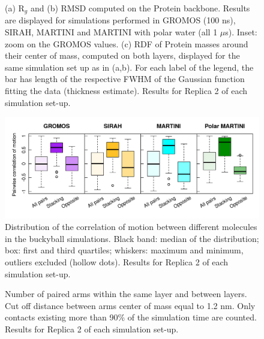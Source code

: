 \begin{figure}[h!]
\caption[(SI) Replica 2: Structural measures on buckyball in solution]{(a) R$_g$ and (b) RMSD computed on the Protein backbone. Results are displayed for simulations performed in GROMOS (100 ns), SIRAH, MARTINI and MARTINI with polar water (all 1 $\mu$s). Inset: zoom on the GROMOS values. (c) RDF of Protein masses around their center of mass, computed on both layers, displayed for the same simulation set up as in (a,b). For each label of the legend, the bar has length of the respective FWHM of the Gaussian function fitting the data (thickness estimate). Results for Replica 2 of each simulation set-up.}
\label{fig:struct_UA_SIhere2}
\end{figure}

\begin{figure}[t]
\centering
\includegraphics[width=0.95\linewidth]{3results_capsule/pics/R2_RKGBcorr_boxplot_all.png} 
\caption[(SI) Replica 2: Correlation of motion between molecules of the buckyball]{Distribution of the correlation of motion between different molecules in the buckyball simulations. Black band: median of the distribution; box: first and third quartiles; whiskers: maximum and minimum, outliers excluded (hollow dots). Results for Replica 2 of each simulation set-up.}
\label{fig:BTI_corr2}
\end{figure}

\begin{figure}[t!]
\centering
\caption[(SI) Replica 2: Arm pairing during simulations of the buckyball]{Number of paired arms within the same layer and between layers. Cut off distance between arms center of mass equal to 1.2 nm. Only contacts existing more than 90\% of the simulation time are counted. Results for Replica 2 of each simulation set-up.}
\label{fig:BTI_beta2}
\end{figure}

